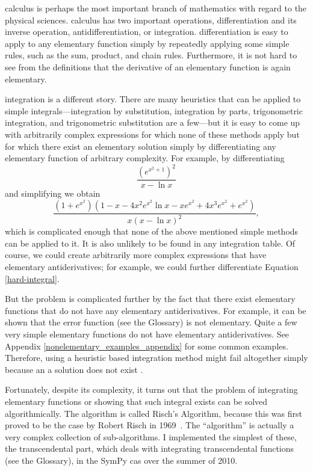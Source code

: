 \Gls{calculus} is perhaps the most important branch of mathematics with
regard to the physical sciences.  \Gls{calculus} has two important
operations, \gls{differentiation} and its inverse operation,
antidifferentiation, or \gls{integration}.  \Gls{differentiation} is
easy to apply to any \gls{elementary} function simply by repeatedly
applying some simple rules, such as the sum, product, and chain rules.
Furthermore, it is not hard to see from the definitions that the
derivative of an \gls{elementary} function is again \gls{elementary}.

\Gls{integration} is a different story.  There are many heuristics that
can be applied to simple integrals---\gls{integration} by substitution,
\gls{integration} by parts, trigonometric \gls{integration}, and
trigonometric substitution are a few---but it is easy to come up with
arbitrarily complex expressions for which none of these methods apply
but for which there exist an \gls{elementary} solution simply by
differentiating any elementary function of arbitrary complexity.  For
example, by differentiating
\begin{equation}
\label{hard-integral-sol}
    \frac{\left(e^{x^{2} + 1}\right)^{2}}{x - \ln{x}}
\end{equation}
and simplifying we obtain
\begin{equation}
\label{hard-integral}
    \frac{\left(1 + e^{x^{2}}\right) \left(1 - x - 4 x^{2} e^{x^{2}}
    \ln{x} - x e^{x^{2}} + 4 x^{3} e^{x^{2}} +
    e^{x^{2}}\right)}{x \left(x -
    \ln{x}\right)^{2}},
\end{equation}
which is complicated enough that none of the above mentioned simple
methods can be applied to it.  It is also unlikely to be found in any
integration table.  Of course, we could create arbitrarily more complex
expressions that have elementary antiderivatives; for example, we
could further differentiate Equation \ref{hard-integral}. 

But the problem is complicated further by the fact that there exist
\gls{elementary} functions that do not have any \gls{elementary}
antiderivatives.  For example, it can be shown that the \gls{error
function} (see the Glossary) is not elementary.  Quite a few very simple
elementary functions do not have elementary antiderivatives.  See
Appendix \ref{nonelementary_examples_appendix} for some common examples.
Therefore, using a heuristic based \gls{integration} method might fail
altogether simply because an a solution does not exist .

Fortunately, despite its complexity, it turns out that the problem of
integrating elementary functions or showing that such integral exists
can be solved algorithmically.  The algorithm is called Risch's
Algorithm, because this was first proved to be the case by Robert Risch
in 1969~\cite{risch1969problem}.  The ``algorithm'' is actually a very
complex collection of sub-algorithms.  I implemented the simplest of
these, the \gls{transcendental} part, which deals with integrating
\gls{transcendental} functions (see the Glossary), in the SymPy
\gls{cas} over the summer of 2010.
